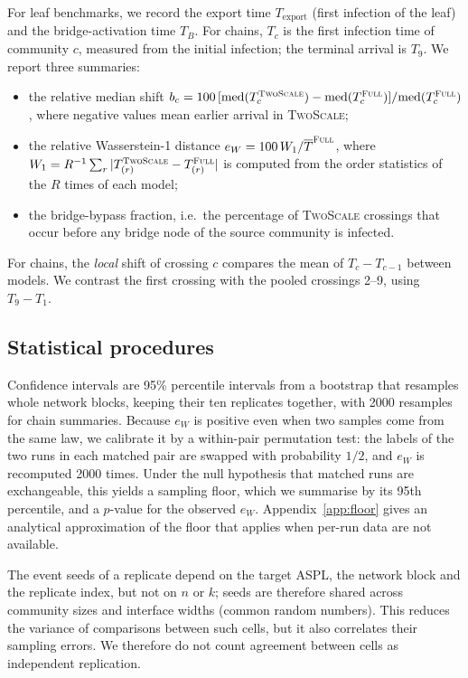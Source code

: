 \documentclass[a4paper,fleqn]{cas-sc}
\newcommand{\Full}{\textup{\textsc{Full}}}
\newcommand{\TS}{\textup{\textsc{TwoScale}}}
\newcommand{\eW}{e_{W}}
\begin{document}
For leaf benchmarks, we record the export time $T_{\mathrm{export}}$ (first infection of the leaf) and the bridge-activation time $T_B$. For chains, $T_c$ is the first infection time of community $c$, measured from the initial infection; the terminal arrival is $T_9$. We report three summaries:
\begin{itemize}
\item the relative median shift $b_c=100\,[\mathrm{med}(T^{\TS}_c)-\mathrm{med}(T^{\Full}_c)]/\mathrm{med}(T^{\Full}_c)$, where negative values mean earlier arrival in \TS{};
\item the relative Wasserstein-1 distance $\eW=100\,W_1/\overline{T}^{\Full}$, where $W_1=R^{-1}\sum_r|T^{\TS}_{(r)}-T^{\Full}_{(r)}|$ is computed from the order statistics of the $R$ times of each model;
\item the bridge-bypass fraction, i.e.\ the percentage of \TS{} crossings that occur before any bridge node of the source community is infected.
\end{itemize}
For chains, the \emph{local} shift of crossing $c$ compares the mean of $T_c-T_{c-1}$ between models. We contrast the first crossing with the pooled crossings 2--9, using $T_9-T_1$.

\subsection{Statistical procedures}

Confidence intervals are 95\% percentile intervals from a bootstrap that resamples whole network blocks, keeping their ten replicates together, with 2000 resamples for chain summaries. Because $\eW$ is positive even when two samples come from the same law, we calibrate it by a within-pair permutation test: the labels of the two runs in each matched pair are swapped with probability $1/2$, and $\eW$ is recomputed 2000 times. Under the null hypothesis that matched runs are exchangeable, this yields a sampling floor, which we summarise by its 95th percentile, and a $p$-value for the observed $\eW$. Appendix~\ref{app:floor} gives an analytical approximation of the floor that applies when per-run data are not available.

The event seeds of a replicate depend on the target ASPL, the network block and the replicate index, but not on $n$ or $k$; seeds are therefore shared across community sizes and interface widths (common random numbers). This reduces the variance of comparisons between such cells, but it also correlates their sampling errors. We therefore do not count agreement between cells as independent replication.
\end{document}
